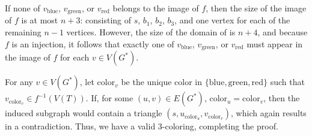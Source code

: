 \documentclass[12pt]{article}
\begin{document}
	\medskip
	
	If none of \(v_{\text{blue}}\), \(v_{\text{green}}\), or \(v_{\text{red}}\)
	belongs to the image of \(f\), then the size of the image of \(f\) is at
	most \(n + 3\): consisting of \(s\), \(b_{1}\), \(b_{2}\), \(b_{3}\), and
	one vertex for each of the remaining \(n - 1\) vertices. However, the size
	of the domain of is \(n + 4\), and because \(f\) is an injection, it follows
	that exactly one of \(v_{\text{blue}}\), \(v_{\text{green}}\), or
	\(v_{\text{red}}\) must appear in the image of \(f\) for each \(v \in
	V(G^{\ast})\).
	
	\medskip
	
	For any \(v \in V(G^{\ast})\), let \(\text{color}_{v}\) be the unique
	color in \(\{\text{blue}, \text{green}, \text{red}\}\) such that
	\(v_{\text{color}_v} \in f^{-1}(V(T))\). If, for some \((u, v) \in
	E(G^{\ast})\), \(\text{color}_{u} = \text{color}_{v}\), then the induced
	subgraph would contain a triangle \((s, u_{\text{color}_{u}},
	v_{\text{color}_{v}})\), which again results in a contradiction. Thus, we
	have a valid \(3\)-coloring, completing the proof.
\end{document}
